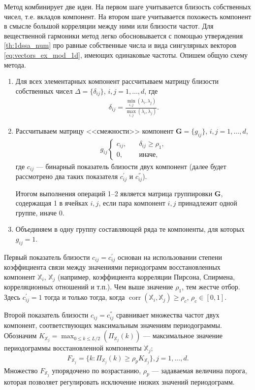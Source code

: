 \documentclass[specialist,
               substylefile = spbu.rtx,
               subf,href,colorlinks=true, 12pt]{disser}
\def\corr{\mathop{\mathrm{corr}}}
\begin{document}
Метод комбинирует две идеи. На первом шаге учитывается близость собственных чисел, т.е. вкладов компонент. На втором шаге учитывается похожесть компонент в смысле большой корреляции между ними или близости частот.
Для вещественной гармоники метод легко обосновывается с помощью утверждения \ref{th:1dssa_num} про равные собственные числа и вида сингулярных векторов \eqref{eq:vectors_ex_mod_1d}, имеющих одинаковые частоты. 
Опишем общую схему метода.
\begin{enumerate}
\item Для всех элементарных компонент рассчитываем матрицу близости собственных чисел $\Delta = \{\delta_{ij}\}$, $i,j=1,\ldots,d$, где
\begin{gather}
\label{eq:delta}
\delta_{ij} = \frac{\min_{i, j}(\lambda_i, \lambda_j)}{\max_{i,j}(\lambda_i, \lambda_j)}.
\end{gather}
\item Рассчитываем матрицу <<смежности>> компонент $\mathbf{G}=\{g_{ij}\}$, $i,j = 1,\ldots,d$,
\begin{gather} \label{eq:g_ij}
g_{ij}
\begin{cases}
c_{ij}, &\quad \delta_{ij} \geqslant \rho_1, \\
0, &\quad \text{иначе},
\end{cases} 
\end{gather}
где $c_{ij}$ --- бинарный показатель близости двух компонент (далее будет рассмотрено два таких показателя  $c^{'}_{ij}$ и  $c^{''}_{ij}$).

Итогом выполнения операций 1--2 является матрица группировки $\mathbf{G}$, содержащая 1 в ячейках $i,j$, если пара компонент $i,j$ принадлежит одной группе, иначе 0.
\item Объединяем в одну группу составляющей ряда те  компоненты, для которых $g_{ij} = 1$.
\end{enumerate}

Первый показатель близости $c_{ij} = c^{'}_{ij}$ основан на использовании
степени коэффициента связи между значениями периодограмм восстановленных компонент $\mathbb{X}_i$, $\mathbb{X}_j$ (например, коэффициента корреляции Пирсона, Спирмена, корреляционных отношений и т.п.). Чем выше значение $\rho_1$, тем жестче отбор.
Здесь $c^{'}_{ij} = 1$ тогда и только тогда, когда $\corr(\mathbb{X}_i, \mathbb{X}_j) \geqslant \rho_c$, $\rho_c \in [0,1]$.

Второй показатель близости $c_{ij} =c^{''}_{ij}$ сравнивает множества частот двух компонент, соответствующих максимальным значениям периодограммы. 
Обозначим 
$K_{\mathbb{X}_j} = \max_{0\leqslant k \leqslant L/2}\left(\Pi_{\mathbb{X}_j}(k)\right)$ --- максимальное значение периодограммы восстановленной компоненты $\mathbb{X}_j$;
\begin{gather} \label{eq:f_j}
F_{\mathbb{X}_j} =  \{ k: \Pi_{\mathbb{X}_j}(k) \geqslant \rho_p K_{\mathbb{X}_j}  \}, j = 1,\ldots, d.
\end{gather}
Множество $F_{\mathbb{X}_j}$ упорядочено по возрастанию, $\rho_p$ --- задаваемая величина порога, которая позволяет регулировать исключение низких значений периодограмм.
\end{document}
